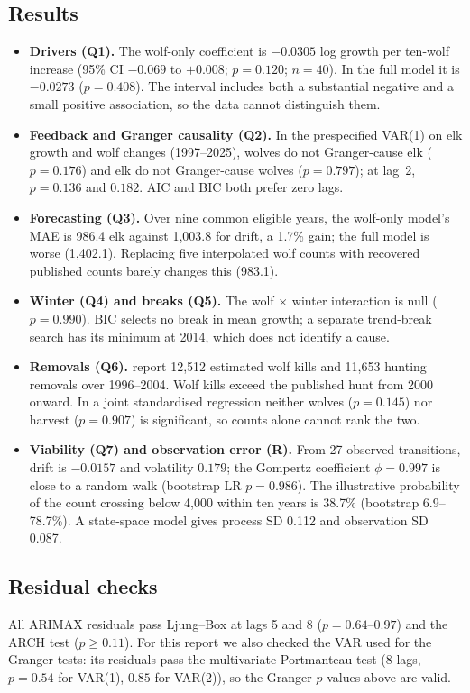 \documentclass[11pt,a4paper]{article}
\begin{document}
\subsection{Results}
\begin{itemize}
\item \textbf{Drivers (Q1).} The wolf-only coefficient is $-0.0305$ log growth per ten-wolf increase (95\% CI $-0.069$ to $+0.008$; $p=0.120$; $n=40$). In the full model it is $-0.0273$ ($p=0.408$). The interval includes both a substantial negative and a small positive association, so the data cannot distinguish them.
\item \textbf{Feedback and Granger causality (Q2).} In the prespecified VAR(1) on elk growth and wolf changes (1997--2025), wolves do not Granger-cause elk ($p=0.176$) and elk do not Granger-cause wolves ($p=0.797$); at lag~2, $p=0.136$ and $0.182$. AIC and BIC both prefer zero lags.
\item \textbf{Forecasting (Q3).} Over nine common eligible years, the wolf-only model's MAE is 986.4 elk against 1{,}003.8 for drift, a 1.7\% gain; the full model is worse (1{,}402.1). Replacing five interpolated wolf counts with recovered published counts barely changes this (983.1).
\item \textbf{Winter (Q4) and breaks (Q5).} The wolf $\times$ winter interaction is null ($p=0.990$). BIC selects no break in mean growth; a separate trend-break search has its minimum at 2014, which does not identify a cause.
\item \textbf{Removals (Q6).} \citet{eberhardt2007} report 12{,}512 estimated wolf kills and 11{,}653 hunting removals over 1996--2004. Wolf kills exceed the published hunt from 2000 onward. In a joint standardised regression neither wolves ($p=0.145$) nor harvest ($p=0.907$) is significant, so counts alone cannot rank the two.
\item \textbf{Viability (Q7) and observation error (R).} From 27 observed transitions, drift is $-0.0157$ and volatility $0.179$; the Gompertz coefficient $\phi=0.997$ is close to a random walk (bootstrap LR $p=0.986$). The illustrative probability of the count crossing below 4{,}000 within ten years is 38.7\% (bootstrap 6.9--78.7\%). A state-space model gives process SD 0.112 and observation SD 0.087.
\end{itemize}

\subsection{Residual checks}
All ARIMAX residuals pass Ljung--Box at lags 5 and 8 ($p=0.64$--$0.97$) and the ARCH test ($p\ge0.11$). For this report we also checked the VAR used for the Granger tests: its residuals pass the multivariate Portmanteau test (8 lags, $p=0.54$ for VAR(1), $0.85$ for VAR(2)), so the Granger $p$-values above are valid.
\end{document}
